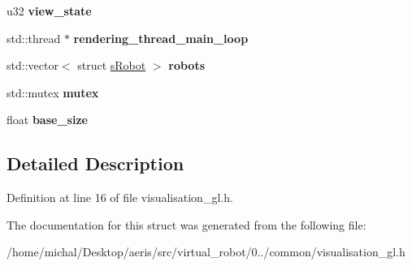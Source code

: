 \begin{DoxyCompactItemize}
\item 
\hypertarget{structsVisualisation_ae3289ed01b623a58dd6bbad98a925dcb}{u32 {\bfseries view\-\_\-state}}\label{structsVisualisation_ae3289ed01b623a58dd6bbad98a925dcb}

\item 
\hypertarget{structsVisualisation_aac9a3bc6ab4c53dedc41f3f389c77663}{std\-::thread $\ast$ {\bfseries rendering\-\_\-thread\-\_\-main\-\_\-loop}}\label{structsVisualisation_aac9a3bc6ab4c53dedc41f3f389c77663}

\item 
\hypertarget{structsVisualisation_a6d9ac505605739c8d689ac106457c056}{std\-::vector$<$ struct \hyperlink{structsRobot}{s\-Robot} $>$ {\bfseries robots}}\label{structsVisualisation_a6d9ac505605739c8d689ac106457c056}

\item 
\hypertarget{structsVisualisation_ae334065d927faa181d4ca4559aba2fa3}{std\-::mutex {\bfseries mutex}}\label{structsVisualisation_ae334065d927faa181d4ca4559aba2fa3}

\item 
\hypertarget{structsVisualisation_a02f4f8550fb3868e704829218a5219e3}{float {\bfseries base\-\_\-size}}\label{structsVisualisation_a02f4f8550fb3868e704829218a5219e3}

\end{DoxyCompactItemize}


\subsection{Detailed Description}


Definition at line 16 of file visualisation\-\_\-gl.\-h.



The documentation for this struct was generated from the following file\-:\begin{DoxyCompactItemize}
\item 
/home/michal/\-Desktop/aeris/src/virtual\-\_\-robot/0../common/visualisation\-\_\-gl.\-h\end{DoxyCompactItemize}
